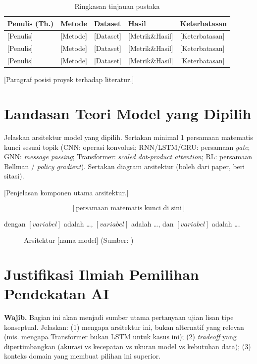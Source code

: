 \documentclass[11pt,a4paper,oneside]{report}
\begin{document}
\begin{table}[h!]
\centering
\caption{Ringkasan tinjauan pustaka}
\label{tab:related-work}
\begin{tabularx}{\textwidth}{lXXXX}
\toprule
\textbf{Penulis (Th.)} & \textbf{Metode} & \textbf{Dataset} & \textbf{Hasil} & \textbf{Keterbatasan} \\
\midrule
{[Penulis]} \cite{ref1} & [Metode] & [Dataset] & [Metrik\&Hasil] & [Keterbatasan] \\
{[Penulis]} \cite{ref2} & [Metode] & [Dataset] & [Metrik\&Hasil] & [Keterbatasan] \\
{[Penulis]} \cite{ref3} & [Metode] & [Dataset] & [Metrik\&Hasil] & [Keterbatasan] \\
\bottomrule
\end{tabularx}
\end{table}

[Paragraf posisi proyek terhadap literatur.]

\section{Landasan Teori Model yang Dipilih}
\begin{petunjuk}
Jelaskan arsitektur model yang dipilih. Sertakan minimal 1 persamaan matematis kunci sesuai topik (CNN: operasi konvolusi; RNN/LSTM/GRU: persamaan \textit{gate}; GNN: \textit{message passing}; Transformer: \textit{scaled dot-product attention}; RL: persamaan Bellman / \textit{policy gradient}). Sertakan diagram arsitektur (boleh dari paper, beri sitasi).
\end{petunjuk}

[Penjelasan komponen utama arsitektur.]

\begin{equation}
\label{eq:persamaan-utama}
[\text{persamaan matematis kunci di sini}]
\end{equation}

dengan $[variabel]$ adalah \ldots, $[variabel]$ adalah \ldots, dan $[variabel]$ adalah \ldots.

\begin{figure}[h!]
\centering
\caption{Arsitektur [nama model] (Sumber: \cite{ref1})}
\label{fig:arsitektur}
\end{figure}

\section{Justifikasi Ilmiah Pemilihan Pendekatan AI}
\begin{petunjuk}
\textbf{Wajib.} Bagian ini akan menjadi sumber utama pertanyaan ujian lisan tipe konseptual. Jelaskan:
(1) mengapa arsitektur ini, bukan alternatif yang relevan (mis. mengapa Transformer bukan LSTM untuk kasus ini);
(2) \textit{tradeoff} yang dipertimbangkan (akurasi vs kecepatan vs ukuran model vs kebutuhan data);
(3) konteks domain yang membuat pilihan ini superior.
\end{petunjuk}
\end{document}
